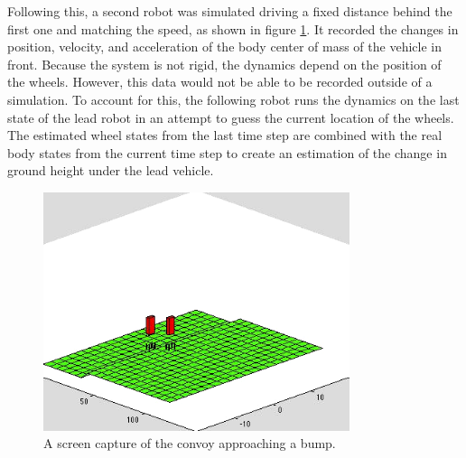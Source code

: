 Following this, a second robot was simulated driving a fixed distance behind the first one and matching the speed, as shown in figure \ref{fig:naive_convoy}. It recorded the changes in position, velocity, and acceleration of the body center of mass of the vehicle in front. Because the system is not rigid, the dynamics depend on the position of the wheels. However, this data would not be able to be recorded outside of a simulation. To account for this, the following robot runs the dynamics on the last state of the lead robot in an attempt to guess the current location of the wheels. The estimated wheel states from the last time step are combined with the real body states from the current time step to create an estimation of the change in ground height under the lead vehicle.

\begin{figure}[t]
	\centering
	\includegraphics[width=0.8\textwidth]{figures/naive_convoy.png}
	\caption{A screen capture of the convoy approaching a bump.}
	\label{fig:naive_convoy}
\end{figure}


